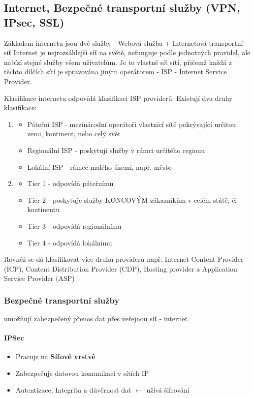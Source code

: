 \documentclass[10pt,a4paper]{article}
\begin{document}
\subsection{Internet, Bezpečné transportní služby (VPN, IPsec, SSL)}
Základem internetu jsou dvě služby - Webová služba + Internetová transportní síť
Internet je nejrozsáhlejší síť na světě, nefunguje podle jednotných pravidel, ale nabízí stejné služby všem uživatelům. Je to vlastně síť sítí, přičemž každá z těchto dílčích sítí je spravována jiným operátorem - ISP - Internet Service Provider.

Klasifikace internetu odpovídá klasifikaci ISP providerů. Existují dva druhy klasifikace:

\begin{enumerate}
\item
\begin{itemize}
\item Páteřní ISP - mezinárodní operátoři vlastnící sítě pokrývající určitou zemi, kontinent, nebo celý svět
\item Regionální ISP - poskytují služby v rámci určitého regionu
\item Lokální ISP - rámec malého území, např. město
\end{itemize}
\item 
\begin{itemize}
\item Tier 1 - odpovídá páteřnímu
\item Tier 2 - poskytuje služby KONCOVÝM zákazníkům v celém státě, či kontinentu
\item Tier 3 - odpovídá regionálnímu
\item Tier 4 - odpovídá lokálnímu
\end{itemize}
\end{enumerate}

Rovněž se dá klasifikovat více druhů providerů např. Internet Content Provider (ICP), Content Distribution Provider (CDP), Hosting provider a Application Service Provider (ASP)
\subsubsection{Bezpečné transportní služby}
umožňují zabezpečený přenos dat přes veřejnou síť - internet.
\paragraph{IPSec}

\begin{itemize}
\item Pracuje na \textbf{Síťové vrstvě}
\item Zabezpečuje datovou komunikaci v sítích IP
\item Autentizace, Integrita a důvěrnost dat $\leftarrow$ užívá šifrování
\end{itemize}
\end{document}
